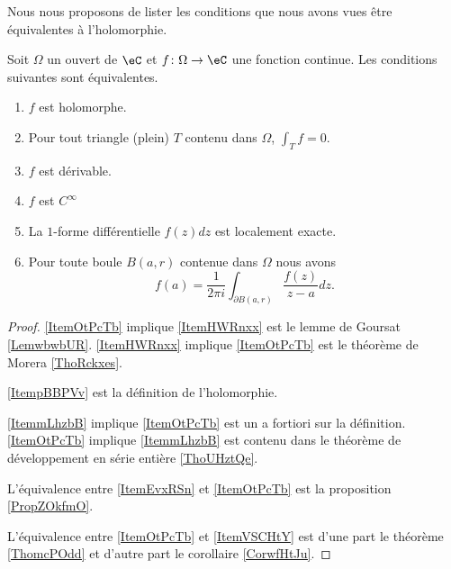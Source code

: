Nous nous proposons de lister les conditions que nous avons vues être équivalentes à l'holomorphie.

\begin{theorem}
    Soit \( \Omega\) un ouvert de \( \eC\) et \( f\colon \Omega\to \eC\) une fonction continue. Les conditions suivantes sont équivalentes.
    \begin{enumerate}
        \item   \label{ItemOtPcTb}
            \( f\) est holomorphe.
        \item   \label{ItemHWRnxx}
            Pour tout triangle (plein) \( T\) contenu dans \( \Omega\), \( \int_Tf=0\).
        \item   \label{ItempBBPVv}
            \( f\) est dérivable.
        \item   \label{ItemmLhzbB}
            \( f\) est \(  C^{\infty}\)
        \item   \label{ItemEvxRSn}
            La \( 1\)-forme différentielle \( f(z)dz\) est localement exacte.
        \item   \label{ItemVSCHtY}
            Pour toute boule \( B(a,r)\) contenue dans \( \Omega\) nous avons
            \begin{equation}
                f(a)=\frac{1}{ 2\pi i }\int_{\partial B(a,r)}\frac{ f(z) }{ z-a }dz.
            \end{equation}
    \end{enumerate}
    
\end{theorem}

\begin{proof}
    \ref{ItemOtPcTb} implique \ref{ItemHWRnxx} est le lemme de Goursat \ref{LemwbwbUR}. \ref{ItemHWRnxx} implique \ref{ItemOtPcTb} est le théorème de Morera \ref{ThoRckxes}.

    \ref{ItempBBPVv} est la définition de l'holomorphie.

    \ref{ItemmLhzbB} implique \ref{ItemOtPcTb} est un a fortiori sur la définition. \ref{ItemOtPcTb} implique \ref{ItemmLhzbB} est contenu dans le théorème de développement en série entière \ref{ThoUHztQe}.

    L'équivalence entre \ref{ItemEvxRSn} et \ref{ItemOtPcTb} est la proposition \ref{PropZOkfmO}.

    L'équivalence entre \ref{ItemOtPcTb} et \ref{ItemVSCHtY} est d'une part le théorème \ref{ThomcPOdd} et d'autre part le corollaire \ref{CorwfHtJu}.
\end{proof}

